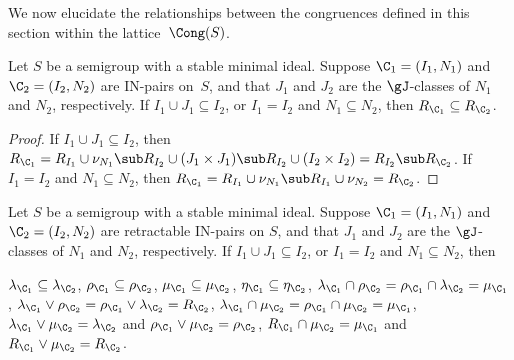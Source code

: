 We now elucidate the relationships between the congruences defined in this section within the lattice~$\Cong(S)$.

\begin{proposition}
\label{prop-CR2}
Let $S$ be a semigroup with a stable minimal ideal.  Suppose $\C_1=(I_1,N_1)$ and ${\C_2=(I_2, N_2)}$ are IN-pairs on~$S$, and that $J_1$ and $J_2$ are the $\gJ$-classes of $N_1$
  and $N_2$, respectively. If $I_1\cup J_1\subseteq I_2$, or $I_1=I_2$ and
  $N_1\subseteq N_2$, then $R_{\C_1}\subseteq R_{\C_2}$.
\end{proposition}

\begin{proof}  If $I_1\cup J_1\subseteq I_2$, then $R_{\C_1}=R_{I_1}\cup \nu_{N_1} \sub R_{I_2}\cup(J_1\times J_1)\sub R_{I_2}\cup(I_2\times I_2)=R_{I_2}\sub R_{\C_2}$.
%
If $I_1=I_2$ and $N_1\subseteq N_2$, then $R_{\C_1}=R_{I_1}\cup\nu_{N_1}\sub R_{I_1}\cup\nu_{N_2}=R_{\C_2}$.
\end{proof}



\begin{proposition}
\label{prop-CR3}
Let $S$ be a semigroup with a stable minimal ideal.  Suppose $\C_1=(I_1,N_1)$ and ${\C_2=(I_2, N_2)}$ are retractable IN-pairs on $S$, and that $J_1$ and $J_2$ are the $\gJ$-classes of $N_1$ and $N_2$, respectively. If $I_1\cup J_1\subseteq I_2$, or $I_1=I_2$ and $N_1\subseteq N_2$, then
\begin{itemize}
\begin{multicols}{2}
 $\lambda_{\C_1}\subseteq \lambda_{\C_2}$,
$\rho_{\C_1}\subseteq \rho_{\C_2}$,
$\mu_{\C_1}\subseteq \mu_{\C_2}$,
$\eta_{\C_1}\subseteq \eta_{\C_2}$,
 $\lambda_{\C_1}\cap \rho_{\C_2}=\rho_{\C_1}\cap \lambda_{\C_2}=\mu_{\C_1}$,
 $\lambda_{\C_1}\vee \rho_{\C_2}=\rho_{\C_1}\vee \lambda_{\C_2}=R_{\C_2}$,
 $\lambda_{\C_1}\cap\mu_{\C_2} = \rho_{\C_1}\cap\mu_{\C_2} = \mu_{\C_1}$,
 $\lambda_{\C_1}\vee\mu_{\C_2} = \lambda_{\C_2}$ and $\rho_{\C_1}\vee\mu_{\C_2} = \rho_{\C_2}$,
 $R_{\C_1}\cap\mu_{\C_2}=\mu_{\C_1}$ and $R_{\C_1}\vee\mu_{\C_2}=R_{\C_2}$.
\end{multicols}
\end{itemize}
\end{proposition}

